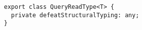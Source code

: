 \begin{verbatim}
export class QueryReadType<T> {
  private defeatStructuralTyping: any;
}
\end{verbatim}
